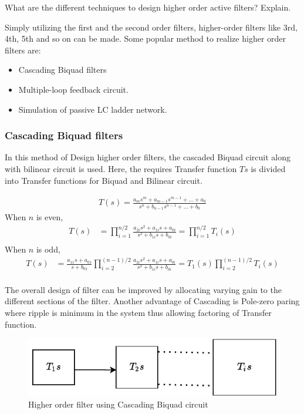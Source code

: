 \documentclass[a4paper,11pt]{article}
\newcommand\ddfrac[2]{\frac{\displaystyle #1}{\displaystyle #2}}
\begin{document}
\begin{Q}
    {
        What are the different techniques to design higher order active filters? Explain.
    }
\end{Q}

Simply utilizing the first and the second order filters, higher-order filters like 3rd, 4th, 5th and so on can be made. Some popular method to realize higher order filters are:

\begin{itemize}
    \item Cascading Biquad filters
    \item Multiple-loop feedback circuit.
    \item Simulation of passive LC ladder network.
\end{itemize}

\subsubsection{Cascading Biquad filters}
In this method of Design higher order filters, the cascaded Biquad circuit along with bilinear circuit is used. Here, the requires Transfer function $Ts$ is divided into Transfer functions for Biquad and Bilinear circuit.

\begin{align*}
    T(s) = \frac{a_{m}s^m + a_{m-1}s^{m-1} + \ldots + a_0 }
    {s^n + b_{n-1}s^{n-1} + \ldots + b_0 }
\end{align*}
When $n$ is even,
\begin{align*}
    T(s) & = \prod_{i=1}^{n/2} \frac{ a_{2i}s^2 + a_{1i}s + a_{0i}}
    { s^2 + b_{1i}s + b_{0i}}       = \prod_{i=1}^{n/2}T_i(s)       \\
\end{align*}
When $n$ is odd,
\begin{align*}
    T(s) & = \ddfrac{a_{11}s+a_{01}}{s+b_{01}}
    \prod_{i=2}^{( n-1 )/2} \frac{ a_{2i}s^2 + a_{1i}s + a_{0i}}
    { s^2 + b_{1i}s + b_{0i}}  = T_1(s)\prod_{i=2}^{( n-1 )/2}T_i(s) \\
\end{align*}

The overall design of filter can be improved by allocating varying gain to the different sections of the filter. Another advantage of Cascading is Pole-zero paring where ripple is minimum in the system thus allowing factoring of Transfer function.

\begin{figure}[H]
    \centering
    \includegraphics[width=\linewidth]{./FIG/cascade.pdf}
    \caption{Higher order filter using Cascading Biquad circuit}
\end{figure}
\end{document}
